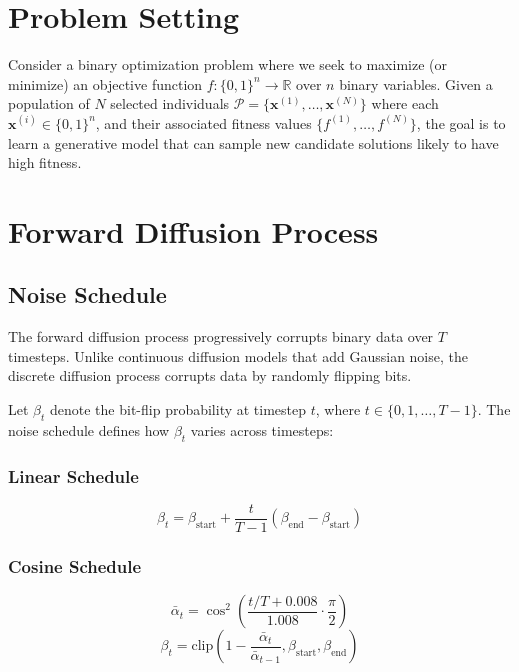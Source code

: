 \documentclass[11pt,a4paper]{article}
\newcommand{\R}{\mathbb{R}}
\newcommand{\vx}{\mathbf{x}}
\begin{document}
\section{Problem Setting}

Consider a binary optimization problem where we seek to maximize (or minimize) an objective function $f: \{0,1\}^n \rightarrow \R$ over $n$ binary variables. Given a population of $N$ selected individuals $\mathcal{P} = \{\vx^{(1)}, \ldots, \vx^{(N)}\}$ where each $\vx^{(i)} \in \{0,1\}^n$, and their associated fitness values $\{f^{(1)}, \ldots, f^{(N)}\}$, the goal is to learn a generative model that can sample new candidate solutions likely to have high fitness.

\section{Forward Diffusion Process}

\subsection{Noise Schedule}

The forward diffusion process progressively corrupts binary data over $T$ timesteps. Unlike continuous diffusion models that add Gaussian noise, the discrete diffusion process corrupts data by randomly flipping bits.

Let $\beta_t$ denote the bit-flip probability at timestep $t$, where $t \in \{0, 1, \ldots, T-1\}$. The noise schedule defines how $\beta_t$ varies across timesteps:

\subsubsection{Linear Schedule}
\begin{equation}
    \beta_t = \beta_{\text{start}} + \frac{t}{T-1}(\beta_{\text{end}} - \beta_{\text{start}})
\end{equation}

\subsubsection{Cosine Schedule}
\begin{equation}
    \bar{\alpha}_t = \cos^2\left(\frac{t/T + 0.008}{1.008} \cdot \frac{\pi}{2}\right)
\end{equation}
\begin{equation}
    \beta_t = \text{clip}\left(1 - \frac{\bar{\alpha}_t}{\bar{\alpha}_{t-1}}, \beta_{\text{start}}, \beta_{\text{end}}\right)
\end{equation}
\end{document}
